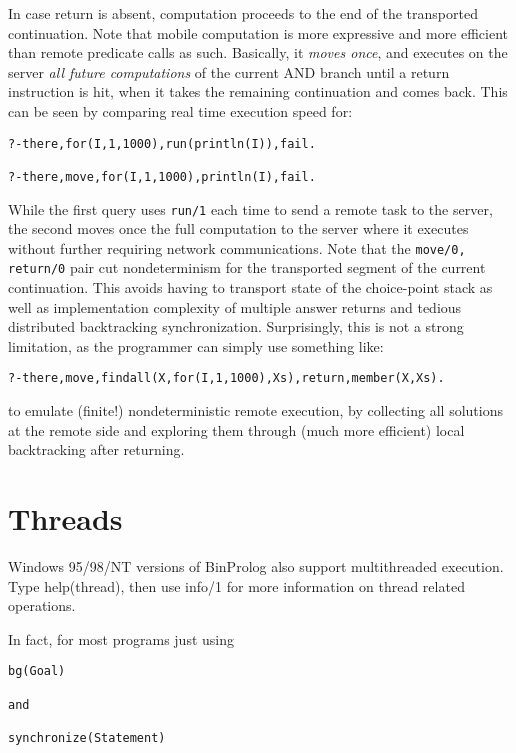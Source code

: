 \documentclass{article}
\begin{document}
In case return is absent, computation proceeds to the end of the transported continuation.
Note that mobile computation is more expressive and more efficient than remote predicate calls as such. Basically, it {\em moves once}, and executes on the server {\em all future computations} of the current AND branch until a return instruction is hit,
when it takes the remaining continuation and comes back. This can be seen by comparing real time execution speed for: 

{\small \begin{verbatim}
?-there,for(I,1,1000),run(println(I)),fail. 

?-there,move,for(I,1,1000),println(I),fail. 
\end{verbatim}}
 
While the first query uses {\tt run/1} each time to send a remote task to the server,
the second moves once the full computation to the server where it executes without
further requiring network communications.
Note that the {\tt move/0, return/0} pair cut nondeterminism for the transported segment
of the current continuation. This avoids having to transport state of the choice-point stack
as well as implementation complexity of multiple answer returns and tedious 
distributed backtracking synchronization. Surprisingly, this is not a strong limitation,
as the programmer can simply use something like:

{\small \begin{verbatim}
?-there,move,findall(X,for(I,1,1000),Xs),return,member(X,Xs).
\end{verbatim}}

\noindent to emulate (finite!) nondeterministic remote execution, by collecting all solutions
at the remote side and exploring them through (much more efficient) local
backtracking after returning.


\section{Threads}

Windows 95/98/NT versions of BinProlog also support multithreaded execution.
Type help(thread), then use info/1 for more information on thread related operations.

In fact, for most programs just using

{\small \begin{verbatim}
bg(Goal)

and

synchronize(Statement)
\end{verbatim}}
\end{document}
